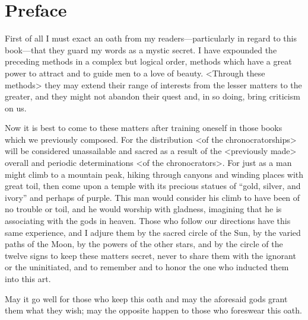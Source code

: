 \section{Preface}

First of all I must exact an oath from my readers—particularly in regard to this book—that they guard my words as a mystic secret. I have expounded the preceding methods in a complex but logical order,
methods which have a great power to attract and to guide men to a love of beauty. <Through these methods> they may extend their range of interests from the lesser matters to the greater, and they might not abandon their quest and, in so doing, bring criticism on us. 

Now it is best to come to these matters after training oneself in those books which we previously composed. For the distribution <of the
chronocratorships> will be considered unassailable and sacred as a result of the <previously made> overall and periodic determinations <of the chronocrators>. For just as a man might climb to a mountain peak, hiking through canyons and winding places with great toil, then come upon a temple with its precious statues of “gold, silver, and ivory” and perhaps of purple. This man would consider his climb to have been of no trouble or toil, and he would worship with gladness, imagining that he is associating with the gods in heaven. Those who follow our directions have this same experience, and I adjure them by the sacred circle of the Sun, by the varied paths of the Moon, by the powers of the other stars, and by the circle of the
twelve signs to keep these matters secret, never to share them with the ignorant or the uninitiated, and to remember and to honor the one who inducted them into this art. 

May it go well for those who keep this oath and may the aforesaid gods grant them what they wish; may the opposite happen to those who foreswear this oath.

\newpage